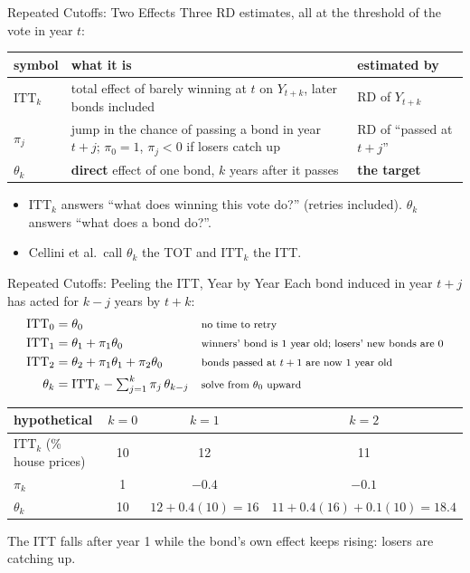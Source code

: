 \documentclass[aspectratio=169,11pt,xcolor=dvipsnames]{beamer}
\begin{document}
\begin{frame}{Repeated Cutoffs: Two Effects}
Three RD estimates, all at the threshold of the vote in year $t$:
\vskip2pt
\begin{center}\small
\renewcommand{\arraystretch}{1.2}
\begin{tabular}{@{}l>{\raggedright\arraybackslash}p{5.6cm}l@{}}
\toprule
symbol & what it is & estimated by \\
\midrule
$\text{ITT}_k$ & total effect of barely winning at $t$ on $Y_{t+k}$, later bonds included & RD of $Y_{t+k}$ \\
$\pi_j$ & jump in the chance of passing a bond in year $t+j$; $\pi_0 = 1$, $\pi_j < 0$ if losers catch up & RD of ``passed at $t+j$'' \\
$\theta_k$ & \textbf{direct} effect of one bond, $k$ years after it passes & \textbf{the target} \\
\bottomrule
\end{tabular}
\end{center}
\vskip3pt
\begin{itemize}\itemsep2pt
  \item $\text{ITT}_k$ answers ``what does winning this vote do?'' (retries
        included). $\theta_k$ answers ``what does a bond do?''.
  \item Cellini et al.\ call $\theta_k$ the TOT and $\text{ITT}_k$ the ITT.
\end{itemize}
\end{frame}

\begin{frame}{Repeated Cutoffs: Peeling the ITT, Year by Year}
Each bond induced in year $t+j$ has acted for $k-j$ years by $t+k$:
\begin{align*}
  \text{ITT}_0 &= \theta_0
   && \text{\footnotesize no time to retry} \\
  \text{ITT}_1 &= \theta_1 + \pi_1\theta_0
   && \text{\footnotesize winners' bond is 1 year old; losers' new bonds are 0} \\
  \text{ITT}_2 &= \theta_2 + \pi_1\theta_1 + \pi_2\theta_0
   && \text{\footnotesize bonds passed at $t+1$ are now 1 year old} \\
  \theta_k &= \text{ITT}_k - \textstyle\sum_{j=1}^{k} \pi_j\,\theta_{k-j}
   && \text{\footnotesize solve from $\theta_0$ upward}
\end{align*}
\vskip-2pt
\begin{center}\small
\renewcommand{\arraystretch}{1.1}
\begin{tabular}{@{}lccc@{}}
\toprule
hypothetical & $k = 0$ & $k = 1$ & $k = 2$ \\
\midrule
$\text{ITT}_k$ (\% house prices) & 10 & 12 & 11 \\
$\pi_k$ & 1 & $-0.4$ & $-0.1$ \\
$\theta_k$ & 10 & $12 + 0.4(10) = 16$ & $11 + 0.4(16) + 0.1(10) = 18.4$ \\
\bottomrule
\end{tabular}
\end{center}
\vskip2pt
The ITT falls after year 1 while the bond's own effect keeps rising: losers are catching up.
\end{frame}
\end{document}
